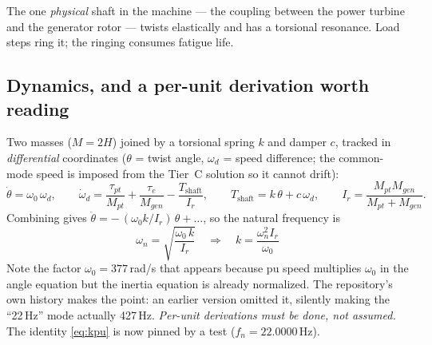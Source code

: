 \documentclass[11pt]{article}
\begin{document}
The one \emph{physical} shaft in the machine --- the coupling between the
power turbine and the generator rotor --- twists elastically and has a
torsional resonance. Load steps ring it; the ringing consumes fatigue
life.

\subsection{Dynamics, and a per-unit derivation worth reading}
Two masses ($M = 2H$) joined by a torsional spring $k$ and damper $c$,
tracked in \emph{differential} coordinates
($\theta$ = twist angle, $\omega_d$ = speed difference; the common-mode
speed is imposed from the Tier~C solution so it cannot drift):
\begin{equation}
  \dot\theta = \omega_0\,\omega_d, \qquad
  \dot\omega_d = \frac{\tau_{pt}}{M_{pt}} + \frac{\tau_{e}}{M_{gen}}
   - \frac{T_\text{shaft}}{I_r}, \qquad
  T_\text{shaft} = k\,\theta + c\,\omega_d, \qquad
  I_r = \frac{M_{pt} M_{gen}}{M_{pt}+M_{gen}} .
\end{equation}
Combining gives $\ddot\theta = -\,(\omega_0 k / I_r)\,\theta + \ldots$, so
the natural frequency is
\begin{equation}
  \boxed{\;\omega_n = \sqrt{\frac{\omega_0\,k}{I_r}}
  \quad\Longrightarrow\quad
  k = \frac{\omega_n^2 I_r}{\omega_0}\;}
  \label{eq:kpu}
\end{equation}
Note the factor $\omega_0 = 377$\,rad/s that appears because pu speed
multiplies $\omega_0$ in the angle equation but the inertia equation is
already normalized. The repository's own history makes the point: an
earlier version omitted it, silently making the ``22\,Hz'' mode actually
427\,Hz. \emph{Per-unit derivations must be done, not assumed.} The
identity \eqref{eq:kpu} is now pinned by a test ($f_n = 22.0000$\,Hz).
\end{document}
